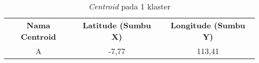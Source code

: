 \begin{table}[H]
\footnotesize
\centering
\begin{tabular}{ccc}
\rowcolor[HTML]{4472C4} 
{\color[HTML]{FFFFFF} \textbf{Nama Centroid}} & {\color[HTML]{FFFFFF} \textbf{Latitude (Sumbu X)}} & {\color[HTML]{FFFFFF} \textbf{Longitude (Sumbu Y)}} \\
\rowcolor[HTML]{D9E1F2} 
A &
  -7,77 &
  113,41
\end{tabular}
\caption{\textit{Centroid} pada 1 klaster}
\label{tab:center1}
\end{table}
